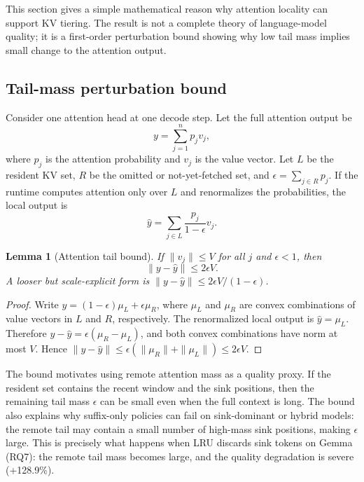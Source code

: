 \documentclass[11pt]{article}
\newcommand{\pct}{\%}
\theoremstyle{definition}
\theoremstyle{plain}
\newtheorem{lemma}{Lemma}
\begin{document}
This section gives a simple mathematical reason why attention locality can support KV tiering.  The result is not a complete theory of language-model quality; it is a first-order perturbation bound showing why low tail mass implies small change to the attention output.

\subsection{Tail-mass perturbation bound}
Consider one attention head at one decode step.  Let the full attention output be
\begin{equation}
  y = \sum_{j=1}^{n} p_j v_j,
\end{equation}
where $p_j$ is the attention probability and $v_j$ is the value vector.  Let $L$ be the resident KV set, $R$ be the omitted or not-yet-fetched set, and $\epsilon=\sum_{j\in R}p_j$.  If the runtime computes attention only over $L$ and renormalizes the probabilities, the local output is
\begin{equation}
  \hat{y}=\sum_{j\in L}\frac{p_j}{1-\epsilon}v_j.
\end{equation}

\begin{lemma}[Attention tail bound]
If $\|v_j\|\le V$ for all $j$ and $\epsilon<1$, then
\begin{equation}
  \|y-\hat{y}\| \le 2\epsilon V.
\end{equation}
A looser but scale-explicit form is $\|y-\hat{y}\|\le 2\epsilon V/(1-\epsilon)$.
\end{lemma}
\begin{proof}
Write $y=(1-\epsilon)\mu_L+\epsilon\mu_R$, where $\mu_L$ and $\mu_R$ are convex combinations of value vectors in $L$ and $R$, respectively.  The renormalized local output is $\hat{y}=\mu_L$.  Therefore $y-\hat{y}=\epsilon(\mu_R-\mu_L)$, and both convex combinations have norm at most $V$.  Hence $\|y-\hat{y}\|\le \epsilon(\|\mu_R\|+\|\mu_L\|)\le2\epsilon V$.
\end{proof}

The bound motivates using remote attention mass as a quality proxy.  If the resident set contains the recent window and the sink positions, then the remaining tail mass $\epsilon$ can be small even when the full context is long.  The bound also explains why suffix-only policies can fail on sink-dominant or hybrid models: the remote tail may contain a small number of high-mass sink positions, making $\epsilon$ large.  This is precisely what happens when LRU discards sink tokens on Gemma (RQ7): the remote tail mass becomes large, and the quality degradation is severe (+128.9\pct{}).
\end{document}
